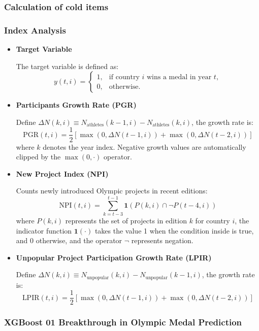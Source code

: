 \documentclass{mcmthesis}
\begin{document}
\subsubsection{Calculation of cold items}
\subsubsection{Index Analysis}

\begin{itemize}[leftmargin=0.15in, labelsep=0.1in, itemsep=1pt, parsep=0pt]
	\item \textbf{Target Variable}
	
	The target variable is defined as:
	\[
	y(t,i) = 
	\begin{cases} 
		1, & \text{if country } i \text{ wins a medal in year } t, \\ 
		0, & \text{otherwise.}
	\end{cases}
	\]
	
	\item \textbf{Participants Growth Rate (PGR)}
	
	Define \(\Delta N(k,i) \equiv N_{\text{athletes}}(k-1,i) - N_{\text{athletes}}(k,i)\), the growth rate is:
	\[
	\text{PGR}(t,i) = \frac{1}{2} \left[ \max(0, \Delta N(t-1,i)) + \max(0, \Delta N(t-2,i)) \right]
	\]
	where \(k\) denotes the year index. Negative growth values are automatically clipped by the \(\max(0,\cdot)\) operator.
	
	\item \textbf{New Project Index (NPI)}
	
	Counts newly introduced Olympic projects in recent editions:
	\[
	\text{NPI}(t,i) = \sum_{k=t-3}^{t-1} \mathbf{1}\left( P(k,i) \cap \neg P(t-4, i) \right)
	\]
	where \( P(k, i) \) represents the set of projects in edition \( k \) for country \( i \), the indicator function \( \mathbf{1}(\cdot) \) takes the value 1 when the condition inside is true, and 0 otherwise, and the operator \(\neg\) represents negation.
	
	\item \textbf{Unpopular Project Participation Growth Rate (LPIR)}
	
	Define \(\Delta N(k,i) \equiv N_{\text{unpopular}}(k,i) - N_{\text{unpopular}}(k-1,i)\), the growth rate is:
	\[
	\text{LPIR}(t,i) = \frac{1}{2} \left[ \max(0, \Delta N(t-1,i)) + \max(0, \Delta N(t-2,i)) \right]
	\]
\end{itemize}


\subsubsection{XGBoost 01 Breakthrough in Olympic Medal Prediction}
\end{document}
